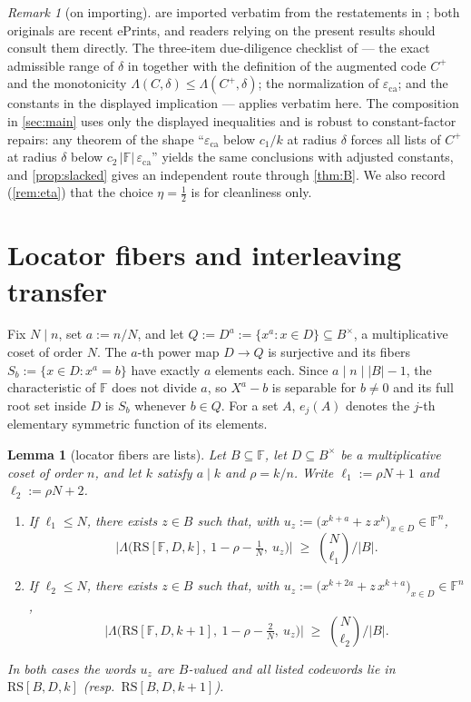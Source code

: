 \documentclass[11pt]{article}
\newtheorem{lemma}[theorem]{Lemma}
\theoremstyle{definition}
\theoremstyle{remark}
\newtheorem{remark}[theorem]{Remark}
\newcommand{\F}{\mathbb{F}}
\newcommand{\B}{B}
\newcommand{\RS}{\mathrm{RS}}
\newcommand{\eca}{\varepsilon_{\mathrm{ca}}}
\newcommand{\Lst}{\Lambda}
\begin{document}
\begin{remark}[on importing]\label{rem:import}
 are imported verbatim from the restatements in \cite{ABF26}; both originals are recent ePrints, and readers relying on the present results should consult them directly. The three-item due-diligence checklist of \cite{Cho26b} --- the exact admissible range of $\delta$ in \cite[Thm.~2]{CS25} together with the definition of the augmented code $C^+$ and the monotonicity $\Lst(C,\delta)\le\Lst(C^+,\delta)$; the normalization of $\eca$; and the constants in the displayed implication --- applies verbatim here. The composition in \cref{sec:main} uses only the displayed inequalities and is robust to constant-factor repairs: any theorem of the shape ``$\eca$ below $c_1/k$ at radius $\delta$ forces all lists of $C^+$ at radius $\delta$ below $c_2\,|\F|\,\eca$'' yields the same conclusions with adjusted constants, and \cref{prop:slacked} gives an independent route through \cref{thm:B}. We also record (\cref{rem:eta}) that the choice $\eta=\frac12$ is for cleanliness only.
\end{remark}

\section{Locator fibers and interleaving transfer}\label{sec:fiber}

Fix $N\mid n$, set $a:=n/N$, and let $Q:=D^{a}:=\{x^a:x\in D\}\subseteq\B^\times$, a multiplicative coset of order $N$. The $a$-th power map $D\to Q$ is surjective and its fibers $S_b:=\{x\in D:x^a=b\}$ have exactly $a$ elements each. Since $a\mid n\mid|\B|-1$, the characteristic of $\F$ does not divide $a$, so $X^a-b$ is separable for $b\ne0$ and its full root set inside $D$ is $S_b$ whenever $b\in Q$. For a set $A$, $e_j(A)$ denotes the $j$-th elementary symmetric function of its elements.

\begin{lemma}[locator fibers are lists]\label{lem:fiber}
Let $\B\subseteq\F$, let $D\subseteq\B^\times$ be a multiplicative coset of order $n$, and let $k$ satisfy $a\mid k$ and $\rho=k/n$. Write $\ell_1:=\rho N+1$ and $\ell_2:=\rho N+2$.
\begin{enumerate}[label=\textup{(\roman*)}]
\item If $\ell_1\le N$, there exists $z\in\B$ such that, with $u_z:=\bigl(x^{k+a}+z\,x^{k}\bigr)_{x\in D}\in\F^n$,
\[
\bigl|\Lst\bigl(\RS[\F,D,k],\ 1-\rho-\tfrac1N,\ u_z\bigr)\bigr|\;\ge\;\binom{N}{\ell_1}\Big/|\B| .
\]
\item If $\ell_2\le N$, there exists $z\in\B$ such that, with $u_z:=\bigl(x^{k+2a}+z\,x^{k+a}\bigr)_{x\in D}\in\F^n$,
\[
\bigl|\Lst\bigl(\RS[\F,D,k+1],\ 1-\rho-\tfrac2N,\ u_z\bigr)\bigr|\;\ge\;\binom{N}{\ell_2}\Big/|\B| .
\]
\end{enumerate}
In both cases the words $u_z$ are $\B$-valued and all listed codewords lie in $\RS[\B,D,k]$ \textup(resp.\ $\RS[\B,D,k+1]$\textup).
\end{lemma}
\end{document}
